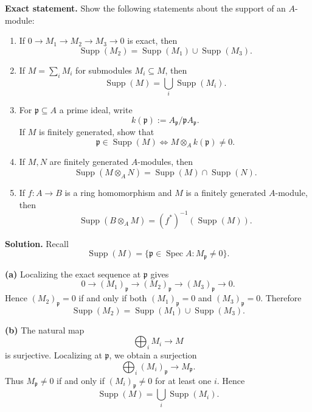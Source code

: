 \documentclass[12pt,a4paper]{article}
\theoremstyle{plain}
\theoremstyle{definition}      %
\begin{document}
	\textbf{Exact statement.}
	Show the following statements about the support of an \(A\)-module:
	
	\begin{enumerate}[label=(\alph*)]
		\item If \(0\to M_1\to M_2\to M_3\to 0\) is exact, then
		\[
		\operatorname{Supp}(M_2)=\operatorname{Supp}(M_1)\cup \operatorname{Supp}(M_3).
		\]
		
		\item If \(M=\sum_i M_i\) for submodules \(M_i\subseteq M\), then
		\[
		\operatorname{Supp}(M)=\bigcup_i \operatorname{Supp}(M_i).
		\]
		
		\item For \(\mathfrak p\subseteq A\) a prime ideal, write
		\[
		k(\mathfrak p):=A_{\mathfrak p}/\mathfrak p A_{\mathfrak p}.
		\]
		If \(M\) is finitely generated, show that
		\[
		\mathfrak p\in \operatorname{Supp}(M)\iff M\otimes_A k(\mathfrak p)\neq 0.
		\]
		
		\item If \(M,N\) are finitely generated \(A\)-modules, then
		\[
		\operatorname{Supp}(M\otimes_A N)=\operatorname{Supp}(M)\cap \operatorname{Supp}(N).
		\]
		
		\item If \(f:A\to B\) is a ring homomorphism and \(M\) is a finitely generated \(A\)-module, then
		\[
		\operatorname{Supp}(B\otimes_A M)=(f^*)^{-1}(\operatorname{Supp}(M)).
		\]
	\end{enumerate}
	
	
	\textbf{Solution.}
	Recall
	\[
	\operatorname{Supp}(M)=\{\mathfrak p\in \operatorname{Spec}A: M_{\mathfrak p}\neq 0\}.
	\]
	
	\textbf{(a)}
	Localizing the exact sequence at \(\mathfrak p\) gives
	\[
	0\to (M_1)_{\mathfrak p}\to (M_2)_{\mathfrak p}\to (M_3)_{\mathfrak p}\to 0.
	\]
	Hence \((M_2)_{\mathfrak p}=0\) if and only if both \((M_1)_{\mathfrak p}=0\) and \((M_3)_{\mathfrak p}=0\).
	Therefore
	\[
	\boxed{\operatorname{Supp}(M_2)=\operatorname{Supp}(M_1)\cup \operatorname{Supp}(M_3).}
	\]
	
	\textbf{(b)}
	The natural map
	\[
	\bigoplus_i M_i \longrightarrow M
	\]
	is surjective. Localizing at \(\mathfrak p\), we obtain a surjection
	\[
	\bigoplus_i (M_i)_{\mathfrak p}\longrightarrow M_{\mathfrak p}.
	\]
	Thus \(M_{\mathfrak p}\neq 0\) if and only if \((M_i)_{\mathfrak p}\neq 0\) for at least one \(i\).
	Hence
	\[
	\boxed{\operatorname{Supp}(M)=\bigcup_i \operatorname{Supp}(M_i).}
	\]
	
\end{document}
